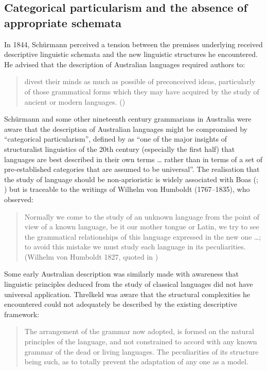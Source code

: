 \subsection{Categorical particularism and the absence of appropriate schemata}
\label{sec:key:2.2.1}

In 1844, Schürmann perceived a tension between the premises underlying received descriptive linguistic schemata and the new linguistic structures he encountered. He advised that the description of Australian languages required authors to:

\begin{quote}
   divest their minds as much as possible of preconceived ideas, particularly of those grammatical forms which they may have acquired by the study of ancient or modern languages. (\citealt[vi]{schurmann_vocabulary_1844})
\end{quote}

\hspace*{-.2pt}Schürmann and some other nineteenth century grammarians in Australia were aware that the description of Australian languages might be compromised by ``categorical particularism'', defined by \citet[2]{haspelmath_comparative_2010} as “one of the major insights of structuralist linguistics of the 20th century (especially the first half) that languages are best described in their own terms … rather than in terms of a set of pre-established categories that are assumed to be universal”. The realisation that the study of language should be non-aprioristic is widely associated with Boas (\citeyear[81]{boas_handbook_1911}; \citealt[4ff.]{haspelmath_comparative_2010}) but is traceable to the writings of Wilhelm von Humboldt (1767--1835), who observed:

\begin{quote}
    Normally we come to the study of an unknown language from the point of view of a known language, be it our mother tongue or Latin, we try to see the grammatical relationships of this language expressed in the new one …; to avoid this mistake we must study each language in its peculiarities. (Wilhelm von Humboldt 1827, quoted in \citealt[105]{morpurgo-davies_language_1975})
\end{quote}

Some early Australian description was similarly made with awareness that linguistic principles deduced from the study of classical languages did not have universal application. Threlkeld was aware that the structural complexities he encountered could not adequately be described by the existing descriptive framework: 
\begin{quote}
    The arrangement of the grammar now adopted, is formed on the natural principles of the language, and not constrained to accord with any known grammar of the dead or living languages. The peculiarities of its structure being such, as to totally prevent the adaptation of any one as a model. \citep[x]{threlkeld_australian_1834}
\end{quote}
 
